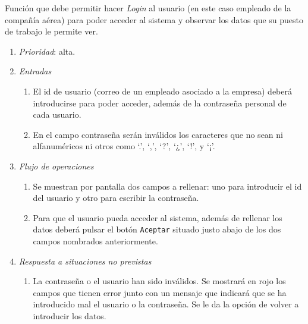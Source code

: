 	Función que debe permitir hacer \textit{\gls{Login}} al usuario (en este caso empleado de la compañía aérea) para poder acceder al sistema y observar los datos que su puesto de trabajo le permite ver.
		
	\begin{enumerate}
		\item \textit{Prioridad}: alta.
		\item \textit{Entradas}
		\begin{enumerate}
			\item El id de usuario (correo de un empleado asociado a la empresa) deberá introducirse para poder acceder, además de la contraseña personal de cada usuario.
			\item En el campo contraseña serán inválidos los caracteres que no sean ni alfanuméricos ni otros como `.', `,', `?', `¿', `!', y `¡'.
		\end{enumerate}
		\item \textit{Flujo de operaciones}
		\begin{enumerate}
			\item Se muestran por pantalla dos campos a rellenar: uno para introducir el id del usuario y otro para escribir la contraseña.
			\item Para que el usuario pueda acceder al sistema, además de rellenar los datos deberá pulsar el botón \verb|Aceptar| situado justo abajo de los dos campos nombrados anteriormente.
		\end{enumerate}
		\item \textit{Respuesta a situaciones no previstas}
		\begin{enumerate}
			\item La contraseña o el usuario han sido inválidos. Se mostrará en rojo los campos que tienen error junto con un mensaje que indicará que se ha introducido mal el usuario o la contraseña. Se le da la opción de volver a introducir los datos.
		\end{enumerate}
	
\end{enumerate}
								
